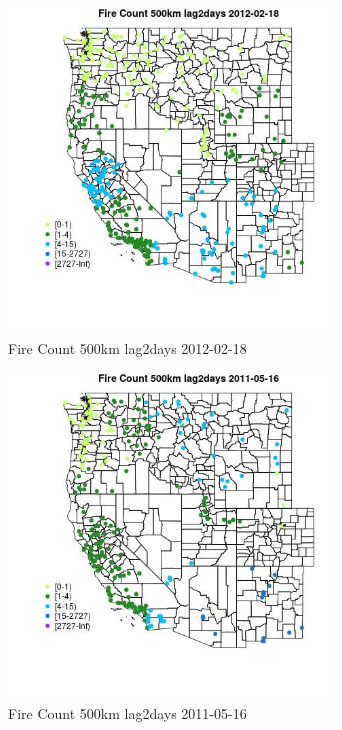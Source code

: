 \begin{figure} 
\centering  
\includegraphics[width=0.77\textwidth]{Code_Outputs/Report_ML_input_PM25_Step4_part_f_de_duplicated_aveswNAs_MapObsFire_Count_500km_lag2days2012-02-18.jpg} 
\caption{\label{fig:Report_ML_input_PM25_Step4_part_f_de_duplicated_aveswNAsMapObsFire_Count_500km_lag2days2012-02-18}Fire Count 500km lag2days 2012-02-18} 
\end{figure} 
 

\begin{figure} 
\centering  
\includegraphics[width=0.77\textwidth]{Code_Outputs/Report_ML_input_PM25_Step4_part_f_de_duplicated_aveswNAs_MapObsFire_Count_500km_lag2days2011-05-16.jpg} 
\caption{\label{fig:Report_ML_input_PM25_Step4_part_f_de_duplicated_aveswNAsMapObsFire_Count_500km_lag2days2011-05-16}Fire Count 500km lag2days 2011-05-16} 
\end{figure} 
 

